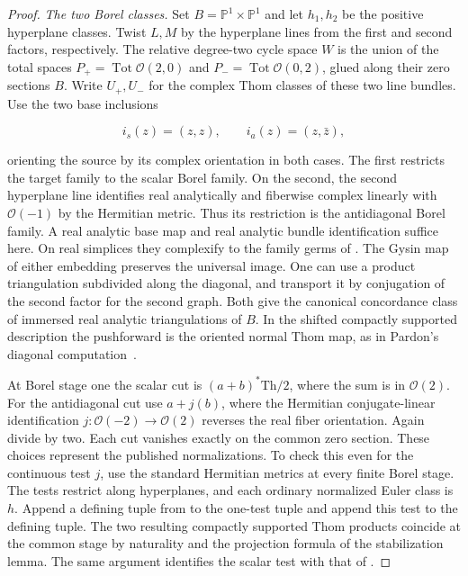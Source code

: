 \begin{proof}
\smallskip\noindent\emph{The two Borel classes.}
Set $B=\mathbb P^1\times\mathbb P^1$ and let $h_1,h_2$ be the
positive hyperplane classes. Twist $L,M$ by the hyperplane lines
from the first and second factors, respectively. The relative
degree-two cycle space $W$ is the union of the total spaces
$P_+=\operatorname{Tot}\mathcal O(2,0)$ and
$P_-=\operatorname{Tot}\mathcal O(0,2)$, glued along their zero
sections $B$. Write $U_+,U_-$ for the complex Thom classes of
these two line bundles. Use the two base inclusions

\[
            i_s(z)=(z,z),\qquad i_a(z)=(z,\bar z),
\]

orienting the source by its complex orientation in both cases.
The first restricts the target family to the scalar Borel family.
On the second, the second hyperplane line identifies real analytically
and fiberwise complex linearly with $\mathcal O(-1)$ by the
Hermitian metric. Thus its restriction is the antidiagonal Borel
family. A real analytic base map and real analytic bundle
identification suffice here. On real simplices they complexify to
the family germs of \cite[Definition~3.1]{Pardon}. The Gysin map of either
embedding preserves the universal image. One can use a product
triangulation subdivided along the diagonal, and transport it by
conjugation of the second factor for the second graph. Both give
the canonical concordance class of immersed real analytic
triangulations of $B$. In the shifted compactly supported
description the pushforward is the oriented normal Thom map, as
in Pardon's diagonal computation~\cite[\S3.1, Lemma 3.5 and proof of Lemma 4.13]{Pardon}.

At Borel stage one the scalar cut is $(a+b)^*\mathrm{Th}/2$,
where the sum is in $\mathcal O(2)$. For the antidiagonal cut
use $a+j(b)$, where the Hermitian conjugate-linear identification
$j:\mathcal O(-2)\to\mathcal O(2)$ reverses the real fiber
orientation. Again divide by two. Each cut vanishes exactly on the
common zero section. These choices represent the published
normalizations. To check this even for the continuous test $j$,
use the standard Hermitian metrics at every finite Borel stage.
The tests restrict along hyperplanes, and each ordinary normalized
Euler class is $h$. Append a defining tuple from \cite[\S2]{PaperIII} to the
one-test tuple and append this test to the defining tuple. The two
resulting compactly supported Thom products coincide at the common
stage by naturality and the projection formula of the stabilization
lemma. The same argument identifies the scalar test with that of \cite[Definition~4.7]{Pardon}.


\end{proof}
